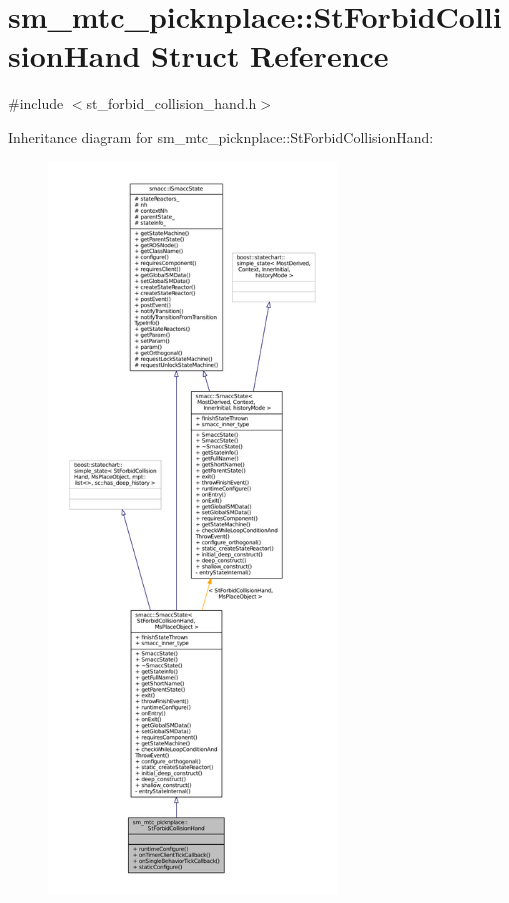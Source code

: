 \hypertarget{structsm__mtc__picknplace_1_1StForbidCollisionHand}{}\section{sm\+\_\+mtc\+\_\+picknplace\+:\+:St\+Forbid\+Collision\+Hand Struct Reference}
\label{structsm__mtc__picknplace_1_1StForbidCollisionHand}


{\ttfamily \#include $<$st\+\_\+forbid\+\_\+collision\+\_\+hand.\+h$>$}



Inheritance diagram for sm\+\_\+mtc\+\_\+picknplace\+:\+:St\+Forbid\+Collision\+Hand\+:
\nopagebreak
\begin{figure}[H]
\begin{center}
\leavevmode
\includegraphics[height=550pt]{structsm__mtc__picknplace_1_1StForbidCollisionHand__inherit__graph}
\end{center}
\end{figure}


